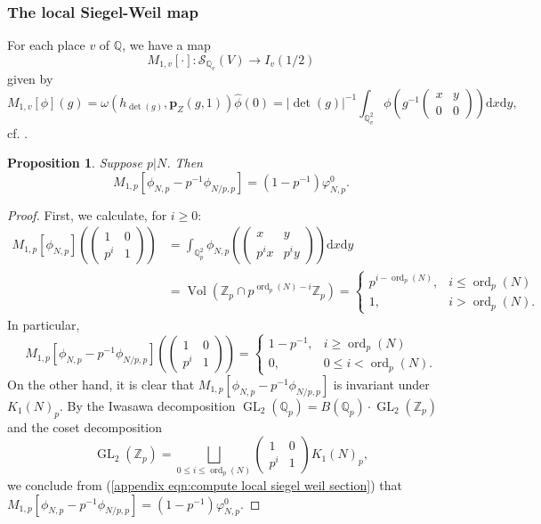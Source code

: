 \documentclass[12pt]{amsart}
\DeclareMathOperator{\ord}{ord}
\newtheorem{prop}[thm]{Proposition}
\theoremstyle{definition}
\newcommand{\Z}{\mathbb{Z}}
\newcommand{\Q}{\mathbb{Q}}
\DeclareMathOperator{\GL}{GL}
\renewcommand{\d}{\mathrm{d}}
\begin{document}
\subsubsection{The local Siegel-Weil map}
For each place $v$ of $\Q$, 
we have a map $$M_{1,v}[\cdot]: \mathcal S_{\Q_v}(V) \to I_v(1/2)$$ given by $$M_{1,v}[\phi](g) = \omega(h_{\det(g)}, \boldsymbol{p}_Z(g, 1)) \widehat \phi(0) =  |\det(g)|^{-1} \int_{\Q_v^2}\phi\left(g^{-1} \begin{pmatrix}
    x & y \\ 0 & 0 \end{pmatrix}\right)\d x\d y,
$$
cf. \cite[\S6.4.6]{sweeting2022tateclassesendoscopyoperatornamegsp4}.
\begin{prop}\label{appendix prop:identify siegel weil section}
Suppose $p |N$. Then $$M_{1,p}[\phi_{N,p} - p^{-1} \phi_{N/p,p}] = (1 - p^{-1}) \varphi^0_{N,p}.$$
\end{prop}
\begin{proof}
First, we calculate, for $i \geq 0$:
 \begin{align*}
        M_{1,p}[\phi_{N,p}]\left(\begin{pmatrix}
        1 & 0 \\ p^i & 1
    \end{pmatrix}\right) &= \int_{\Q_p^2} \phi_{N,p} \left( \begin{pmatrix}
        x & y \\ p^i x & p^i y 
    \end{pmatrix}\right) \d x\d y \\
    &= \operatorname{Vol}(\Z_p \cap p^{\ord_p(N)-i} \Z_p) = \begin{cases} p^{i-\ord_p(N)}, & i \leq \ord_p(N) \\ 1, & i > \ord_p(N).\end{cases}
    \end{align*}
    In particular, \begin{equation}\label{appendix eqn:compute local siegel weil section}
        M_{1,p}[\phi_{N,p} - p^{-1}\phi_{N/p,p}]\left(\begin{pmatrix}
        1 & 0 \\ p^i & 1 
    \end{pmatrix}\right)  = \begin{cases}
        1 - p^{-1}, &  i \geq \ord_p(N) \\ 0, & 0 \leq i < \ord_p(N).
    \end{cases}
    \end{equation}
On the other hand, it is clear that $M_{1,p}[\phi_{N,p} - p^{-1}\phi_{N/p,p}]$ is invariant under $K_1(N)_p$.  
    By the Iwasawa decomposition $\GL_2(\Q_p) = B(\Q_p) \cdot \GL_2(\Z_p)$ and the coset decomposition $$ \GL_2(\Z_p) = \bigsqcup_{0 \leq i \leq \ord_p(N)} \begin{pmatrix}
        1 & 0 \\ p^i & 1 
    \end{pmatrix} K_1(N)_p,$$ we conclude from (\ref{appendix eqn:compute local siegel weil section}) that $M_{1,p}[\phi_{N,p} - p^{-1}\phi_{N/p,p}]= (1- p^{-1})\varphi^0_{N,p}.$
\end{proof}
\end{document}
